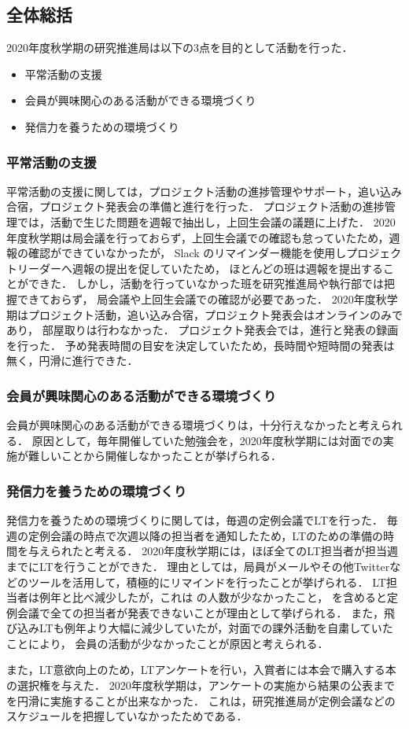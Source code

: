 \subsection*{全体総括}


2020年度秋学期の研究推進局は以下の3点を目的として活動を行った．
\begin{itemize}
\item 平常活動の支援
\item 会員が興味関心のある活動ができる環境づくり
\item 発信力を養うための環境づくり
\end{itemize}

\subsubsection*{平常活動の支援}
平常活動の支援に関しては，プロジェクト活動の進捗管理やサポート，追い込み合宿，プロジェクト発表会の準備と進行を行った．
プロジェクト活動の進捗管理では，活動で生じた問題を週報で抽出し，上回生会議の議題に上げた．
2020年度秋学期は局会議を行っておらず，上回生会議での確認も怠っていたため，週報の確認ができていなかったが，
Slack のリマインダー機能を使用しプロジェクトリーダーへ週報の提出を促していたため，
ほとんどの班は週報を提出することができた．
しかし，活動を行っていなかった班を研究推進局や執行部では把握できておらず，
局会議や上回生会議での確認が必要であった．
2020年度秋学期はプロジェクト活動，追い込み合宿，プロジェクト発表会はオンラインのみであり，
部屋取りは行わなかった．
プロジェクト発表会では，進行と発表の録画を行った．
予め発表時間の目安を決定していたため，長時間や短時間の発表は無く，円滑に進行できた．

\subsubsection*{会員が興味関心のある活動ができる環境づくり}
会員が興味関心のある活動ができる環境づくりは，十分行えなかったと考えられる．
原因として，毎年開催していた勉強会を，2020年度秋学期には対面での実施が難しいことから開催しなかったことが挙げられる．

\subsubsection*{発信力を養うための環境づくり}
発信力を養うための環境づくりに関しては，毎週の定例会議でLTを行った．
毎週の定例会議の時点で次週以降の担当者を通知したため，LTのための準備の時間を与えられたと考える．
2020年度秋学期には，ほぼ全てのLT担当者が担当週までにLTを行うことができた．
理由としては，局員がメールやその他Twitterなどのツールを活用して，積極的にリマインドを行ったことが挙げられる．
LT担当者は例年と比べ減少したが，これは \firstGrade の人数が少なかったこと，
\secondGrade を含めると定例会議で全ての担当者が発表できないことが理由として挙げられる．
また，飛び込みLTも例年より大幅に減少していたが，対面での課外活動を自粛していたことにより，
会員の活動が少なかったことが原因と考えられる．

また，LT意欲向上のため，LTアンケートを行い，入賞者には本会で購入する本の選択権を与えた．
2020年度秋学期は，アンケートの実施から結果の公表までを円滑に実施することが出来なかった．
これは，研究推進局が定例会議などのスケジュールを把握していなかったためである．
